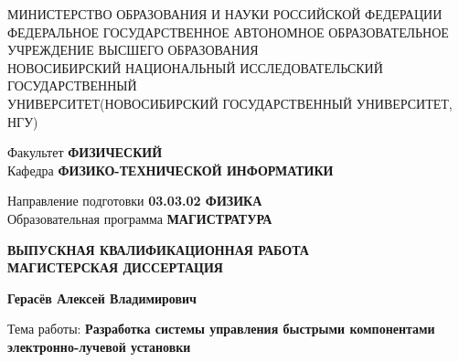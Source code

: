 \documentclass[14pt,russian,a4paper]{extarticle}
\begin{document}
\thispagestyle{empty}

{\footnotesize 

\begin{center}
    МИНИСТЕРСТВО ОБРАЗОВАНИЯ И НАУКИ РОССИЙСКОЙ ФЕДЕРАЦИИ \\
    ФЕДЕРАЛЬНОЕ ГОСУДАРСТВЕННОЕ АВТОНОМНОЕ ОБРАЗОВАТЕЛЬНОЕ \\
    УЧРЕЖДЕНИЕ ВЫСШЕГО ОБРАЗОВАНИЯ \\
    \guillemotleft НОВОСИБИРСКИЙ НАЦИОНАЛЬНЫЙ ИССЛЕДОВАТЕЛЬСКИЙ ГОСУДАРСТВЕННЫЙ \\
    УНИВЕРСИТЕТ\guillemotright (НОВОСИБИРСКИЙ ГОСУДАРСТВЕННЫЙ УНИВЕРСИТЕТ, НГУ)
\end{center}

\vspace{4mm}

\begin{flushleft}
    Факультет {\bf ФИЗИЧЕСКИЙ} \\
    Кафедра {\bf ФИЗИКО-ТЕХНИЧЕСКОЙ ИНФОРМАТИКИ}
\end{flushleft}
\begin{flushleft}
    Направление подготовки {\bf 03.03.02 ФИЗИКА} \\
    Образовательная программа {\bf МАГИСТРАТУРА}
\end{flushleft}

\vspace{4mm}


\begin{center}
    {\bf
    ВЫПУСКНАЯ КВАЛИФИКАЦИОННАЯ РАБОТА \\
    МАГИСТЕРСКАЯ ДИССЕРТАЦИЯ
    }
\end{center}

\begin{center}
    {\bf Герасёв Алексей Владимирович}
\end{center}

\begin{center}
    Тема работы: {\bf Разработка системы управления быстрыми компонентами электронно-лучевой установки}
\end{center}

\vspace{4mm}


\vspace{2mm}

}
\end{document}
